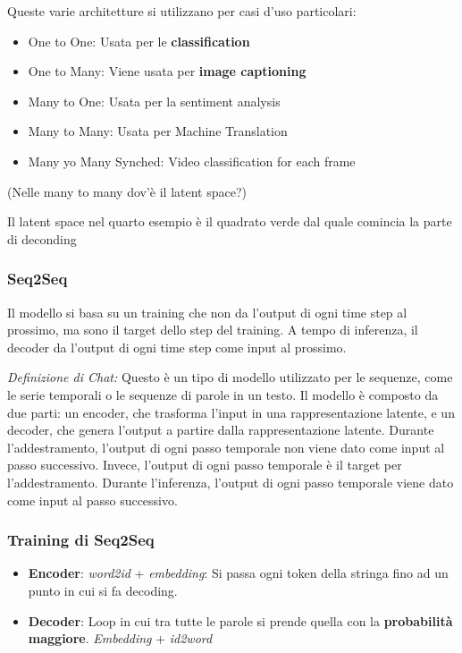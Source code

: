 Queste varie architetture si utilizzano per casi d'uso particolari:

\begin{itemize}
    \item One to One: Usata per le \textbf{classification}
    \item One to Many: Viene usata per \textbf{image captioning}
    \item Many to One: Usata per la sentiment analysis
    \item Many to Many: Usata per Machine Translation
    \item Many yo Many Synched: Video classification for each frame
\end{itemize}

\begin{domanda}(Nelle many to many dov'è il latent space?)

    Il latent space nel quarto esempio è il quadrato verde dal quale comincia la
    parte di deconding
\end{domanda}

\subsubsection{Seq2Seq}
Il modello si basa su un training che non da l'output di ogni time step al prossimo, ma sono il target dello step del training. A tempo di inferenza, il decoder
da l'output di ogni time step come input al prossimo.

\textit{Definizione di Chat:} Questo è un tipo di modello utilizzato per le sequenze, come le serie temporali o 
le sequenze di parole in un testo. Il modello è composto da due parti: un encoder, che trasforma l'input in una 
rappresentazione latente, e un decoder, che genera l'output a partire dalla rappresentazione latente. Durante 
l'addestramento, l'output di ogni passo temporale non viene dato come input al passo successivo. Invece, 
l'output di ogni passo temporale è il target per l'addestramento. Durante l'inferenza, l'output di ogni
 passo temporale viene dato come input al passo successivo.

\subsubsection{Training di Seq2Seq}


\begin{itemize}
    \item \textbf{Encoder}: \textit{word2id} + \textit{embedding}: Si passa ogni token della stringa fino ad un punto in cui si fa decoding.
    \item \textbf{Decoder}: Loop in cui tra tutte le parole si prende quella con la \textbf{probabilità maggiore}. \textit{Embedding} + \textit{id2word} 
\end{itemize}

